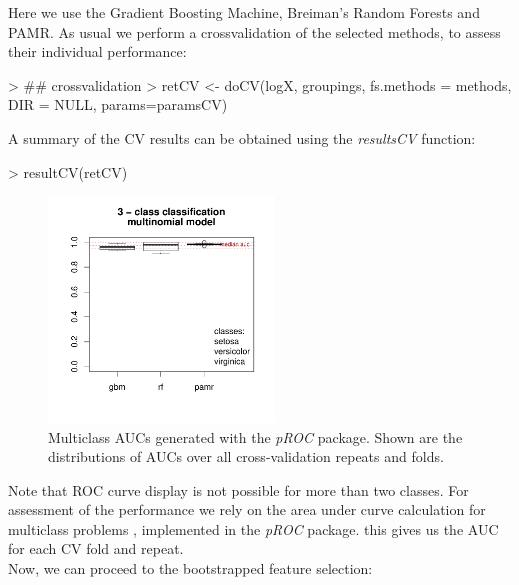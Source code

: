 \documentclass[11pt,a4paper]{article}
\begin{document}
Here we use the Gradient Boosting Machine, Breiman's Random Forests and PAMR. As usual we perform a crossvalidation of the selected methods, to assess their individual performance:

\begin{Schunk}
\begin{Sinput}
> ## crossvalidation
> retCV <- doCV(logX, groupings, fs.methods = methods, DIR = NULL, params=paramsCV)
\end{Sinput}
\end{Schunk}

A summary of the CV results can be obtained using the \emph{resultsCV} function:

 
\begin{Schunk}
\begin{Sinput}
> resultCV(retCV)
\end{Sinput}
\end{Schunk}


\begin{figure}[htp]
\centering
\includegraphics[width=6cm,height=6cm]{resultcvmulti}
\caption{Multiclass AUCs generated with the \emph{pROC} package. Shown are the distributions of AUCs over all cross-validation repeats and folds.}
\label{fig:resultcv}
\end{figure}

Note that ROC curve display is not possible for more than two classes. For assessment of the performance we rely on the area under curve calculation for multiclass problems \cite{Robin2011}, implemented in the \emph{pROC} package. this gives us the AUC for each CV fold and repeat.\\


Now, we can proceed to the bootstrapped feature selection:
\end{document}

